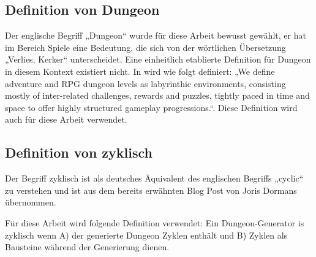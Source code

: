 \subsection{Definition von Dungeon}

Der englische Begriff „Dungeon“ wurde für diese Arbeit bewusst gewählt, er hat im Bereich Spiele eine Bedeutung, die sich von der wörtlichen Übersetzung „Verlies, Kerker“ unterscheidet. Eine einheitlich etablierte Definition für Dungeon in diesem Kontext existiert nicht. In \cite{proceduralGenerationOfDungeons} wird wie folgt definiert: „We define adventure and RPG dungeon levels as labyrinthic environments,  consisting  mostly  of  inter-related  challenges, rewards and puzzles, tightly paced in time and space to offer highly structured gameplay progressions.“. Diese Definition wird auch für diese Arbeit verwendet.








\subsection{Definition von zyklisch}\label{c.weitereskapitel}

Der Begriff zyklisch ist als deutsches Äquivalent des englischen Begriffs „cyclic“ zu verstehen und ist aus dem bereits erwähnten Blog Post von Joris Dormans \cite{blogCyclic} übernommen. 

Für diese Arbeit wird folgende Definition verwendet: Ein Dungeon-Generator is zyklisch wenn A) der generierte Dungeon Zyklen enthält und B) Zyklen als Bausteine während der Generierung dienen.

